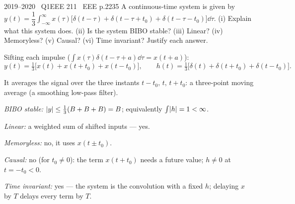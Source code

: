 \begin{qcard}{2019--2020 \textbullet\ Q1}{EEE 211 \textbullet\ EEE p.22}{35}
A continuous-time system is given by $y(t)=\dfrac13\displaystyle\int_{-\infty}^{\infty}x(\tau)\big[\delta(t-\tau)+\delta(t-\tau+t_0)+\delta(t-\tau-t_0)\big]\dd\tau$.
(i) Explain what this system does. (ii) Is the system BIBO stable? (iii) Linear? (iv) Memoryless? (v) Causal? (vi) Time invariant? Justify each answer.
\end{qcard}
\begin{solution}
Sifting each impulse ($\int x(\tau)\delta(t-\tau+a)\dd\tau=x(t+a)$):
\[
y(t)=\tfrac13\big[x(t)+x(t+t_0)+x(t-t_0)\big],\qquad h(t)=\tfrac13\big[\delta(t)+\delta(t+t_0)+\delta(t-t_0)\big].
\]
\begin{steps}
\item It averages the signal over the three instants $t-t_0,\,t,\,t+t_0$: a three-point moving average (a smoothing low-pass filter).
\item \emph{BIBO stable:} $\lvert y\rvert\le\frac13(B+B+B)=B$; equivalently $\int\lvert h\rvert=1<\infty$.
\item \emph{Linear:} a weighted sum of shifted inputs --- yes.
\item \emph{Memoryless:} no, it uses $x(t\pm t_0)$.
\item \emph{Causal:} no (for $t_0\ne0$): the term $x(t+t_0)$ needs a future value; $h\ne0$ at $t=-t_0<0$.
\item \emph{Time invariant:} yes --- the system is the convolution with a fixed $h$; delaying $x$ by $T$ delays every term by $T$.
\end{steps}
\end{solution}


